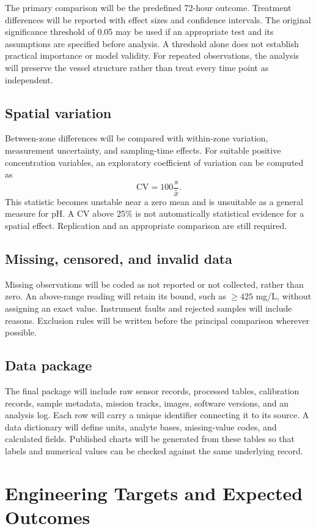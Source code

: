 \documentclass[12pt,a4paper]{article}
\newcommand{\papersection}[1]{\clearpage\section{#1}}
\begin{document}
The primary comparison will be the predefined 72-hour outcome. Treatment differences will be reported with effect sizes and confidence intervals. The original significance threshold of 0.05 may be used if an appropriate test and its assumptions are specified before analysis. A threshold alone does not establish practical importance or model validity. For repeated observations, the analysis will preserve the vessel structure rather than treat every time point as independent.

\subsection{Spatial variation}
Between-zone differences will be compared with within-zone variation, measurement uncertainty, and sampling-time effects. For suitable positive concentration variables, an exploratory coefficient of variation can be computed as
\[
\mathrm{CV}=100\frac{s}{\bar{x}}.
\]
This statistic becomes unstable near a zero mean and is unsuitable as a general measure for pH. A CV above 25\% is not automatically statistical evidence for a spatial effect. Replication and an appropriate comparison are still required.

\subsection{Missing, censored, and invalid data}
Missing observations will be coded as not reported or not collected, rather than zero. An above-range reading will retain its bound, such as $\geq425$ mg/L, without assigning an exact value. Instrument faults and rejected samples will include reasons. Exclusion rules will be written before the principal comparison wherever possible.

\subsection{Data package}
The final package will include raw sensor records, processed tables, calibration records, sample metadata, mission tracks, images, software versions, and an analysis log. Each row will carry a unique identifier connecting it to its source. A data dictionary will define units, analyte bases, missing-value codes, and calculated fields. Published charts will be generated from these tables so that labels and numerical values can be checked against the same underlying record.

\papersection{Engineering Targets and Expected Outcomes}
\end{document}
